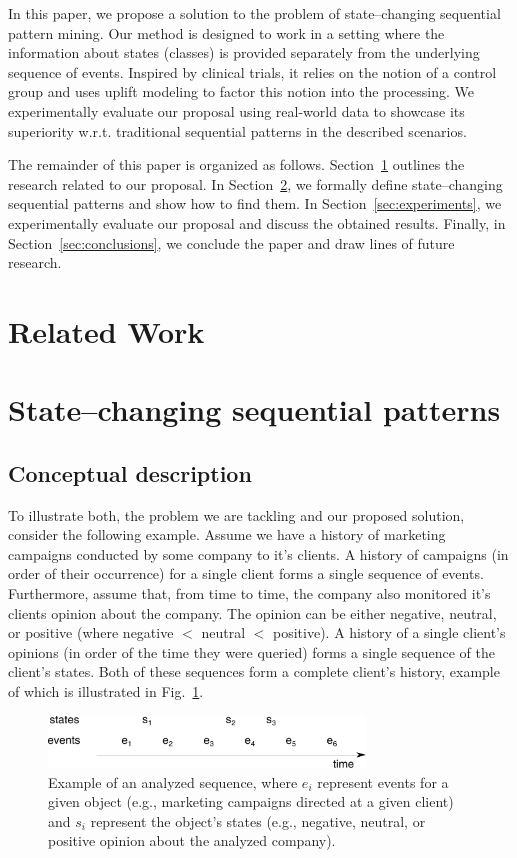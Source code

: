 \documentclass[runningheads,a4paper]{llncs}
\begin{document}
In this paper, we propose a solution to the problem of state--changing sequential pattern mining.
Our method is designed to work in a setting where the information about states (classes) is provided separately from the underlying sequence of events.
Inspired by clinical trials, it relies on the notion of a control group and uses uplift modeling to factor this notion into the processing.
We experimentally evaluate our proposal using real-world data to showcase its superiority w.r.t. traditional sequential patterns in the described scenarios.

The remainder of this paper is organized as follows.
Section~\ref{sec:related} outlines the research related to our proposal.
In Section~\ref{sec:main}, we formally define state--changing sequential patterns and show how to find them.
In Section~\ref{sec:experiments}, we experimentally evaluate our proposal and discuss the obtained results.
Finally, in Section~\ref{sec:conclusions}, we conclude the paper and draw lines of future research.

\section{Related Work}
\label{sec:related}

\section{State--changing sequential patterns}
\label{sec:main}

\subsection{Conceptual description}
To illustrate both, the problem we are tackling and our proposed solution, consider the following example.
Assume we have a history of marketing campaigns conducted by some company to it's clients.
A history of campaigns (in order of their occurrence) for a single client forms a single sequence of events.
Furthermore, assume that, from time to time, the company also monitored it's clients opinion about the company.
The opinion can be either negative, neutral, or positive (where negative $<$ neutral $<$ positive).
A history of a single client's opinions (in order of the time they were queried) forms a single sequence of the client's states.
Both of these sequences form a complete client's history, example of which is illustrated in Fig.~\ref{fig:example}.

\begin{figure}[!ht]
	\centering
		\includegraphics[width=0.75\textwidth]{images/example}
	\caption{Example of an analyzed sequence, where $e_i$ represent events for a given object (e.g., marketing campaigns directed at a given client) and $s_i$ represent the object's states (e.g., negative, neutral, or positive opinion about the analyzed company).}
	\label{fig:example}
\end{figure}
\end{document}
